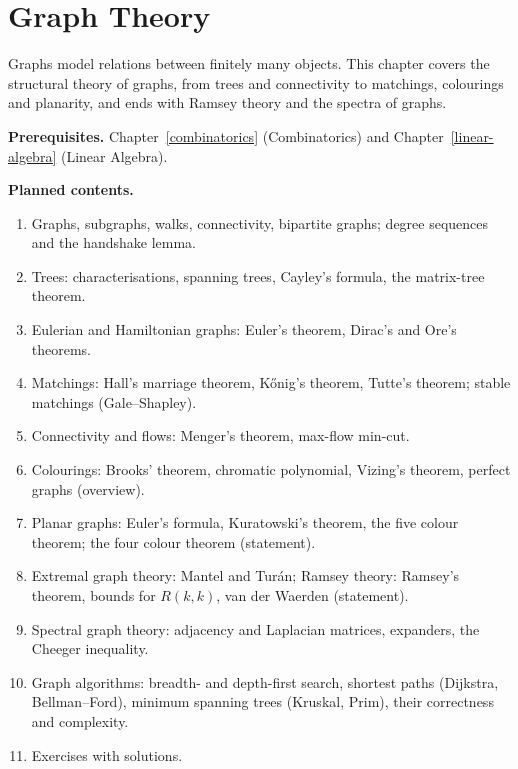 \chapter{Graph Theory}\label{graph-theory}

Graphs model relations between finitely many objects. This chapter covers the structural theory of
graphs, from trees and connectivity to matchings, colourings and planarity, and ends with Ramsey theory and
the spectra of graphs.

\noindent\textbf{Prerequisites.} Chapter~\ref{combinatorics} (Combinatorics) and Chapter~\ref{linear-algebra} (Linear Algebra).

\noindent\textbf{Planned contents.}
\begin{enumerate}
\item Graphs, subgraphs, walks, connectivity, bipartite graphs; degree sequences and the handshake lemma.
\item Trees: characterisations, spanning trees, Cayley's formula, the matrix-tree theorem.
\item Eulerian and Hamiltonian graphs: Euler's theorem, Dirac's and Ore's theorems.
\item Matchings: Hall's marriage theorem, K\H{o}nig's theorem, Tutte's theorem; stable matchings (Gale--Shapley).
\item Connectivity and flows: Menger's theorem, max-flow min-cut.
\item Colourings: Brooks' theorem, chromatic polynomial, Vizing's theorem, perfect graphs (overview).
\item Planar graphs: Euler's formula, Kuratowski's theorem, the five colour theorem; the four colour theorem (statement).
\item Extremal graph theory: Mantel and Tur\'an; Ramsey theory: Ramsey's theorem, bounds for $R(k,k)$, van der Waerden (statement).
\item Spectral graph theory: adjacency and Laplacian matrices, expanders, the Cheeger inequality.
\item Graph algorithms: breadth- and depth-first search, shortest paths (Dijkstra, Bellman--Ford), minimum spanning trees (Kruskal, Prim), their correctness and complexity.
\item Exercises with solutions.
\end{enumerate}
